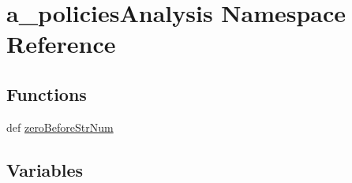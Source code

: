 \hypertarget{namespacea__policies_analysis}{\section{a\-\_\-policies\-Analysis Namespace Reference}
\label{namespacea__policies_analysis}
}
\subsection*{Functions}
\begin{DoxyCompactItemize}
\item 
def \hyperlink{namespacea__policies_analysis_a81d333787e11a8ce58b1af005703b06a}{zero\-Before\-Str\-Num}
\end{DoxyCompactItemize}
\subsection*{Variables}
